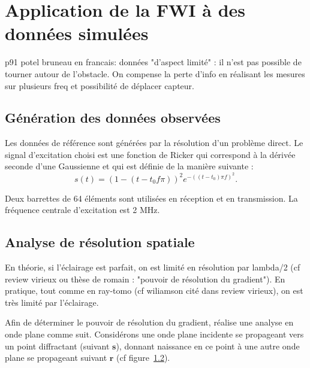 \chapter{Application de la FWI à des données simulées \label{applications}}

p91 potel bruneau en francais: données "d'aspect limité" : il n'est pas possible de tourner autour de l'obstacle. On compense la perte d'info en réalisant les mesures sur plusieurs freq et possibilité de déplacer capteur.

\section{Génération des données observées}

Les données de référence sont générées par la résolution d'un problème direct.
Le signal d'excitation choisi est une fonction de Ricker qui correspond à la dérivée seconde d'une Gaussienne et qui est définie de la manière suivante : 
\begin{equation}
	s(t)=(1-(t-t_{0}f\pi))^2e^{-((t-t_{0})\pi f)^2}\text{.}
\end{equation}

Deux barrettes de 64 éléments sont utilisées en réception et en transmission. La fréquence centrale d'excitation est 2 MHz.





\section{Analyse de résolution spatiale}
En théorie, si l'éclairage est parfait, on est limité en résolution par lambda/2 (cf review virieux ou thèse de romain : "pouvoir de résolution du gradient"). En pratique, tout comme en ray-tomo (cf wiliamson cité dans review virieux), on est très limité par l'éclairage.

Afin de déterminer le pouvoir de résolution du gradient, \cite{sirgue} réalise une analyse en onde plane comme suit. Considérons une onde plane incidente se propageant vers un point diffractant (suivant $\bm{s}$), donnant naissance en ce point à une autre onde plane se propageant suivant $\bm{r}$ (cf figure~\ref{}).

